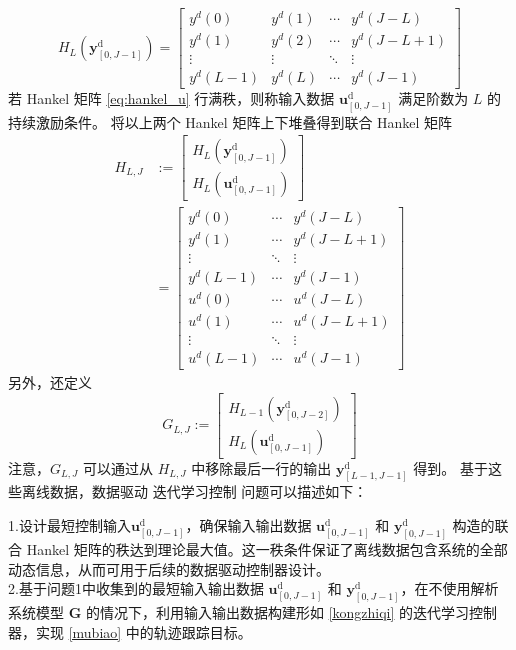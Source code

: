 \begin{equation}
	H_L(\mathbf{y}^{\mathrm{d}}_{[0,J-1]}) = \begin{bmatrix}
		y^d(0)   & y^d(1)   & \cdots & y^d(J-L) \\
		y^d(1)   & y^d(2)   & \cdots & y^d(J-L+1)   \\
		\vdots   & \vdots   & \ddots & \vdots     \\
		y^d(L-1)   & y^d(L) & \cdots & y^d(J-1)
	\end{bmatrix}
	\label{eq:hankel_y}
\end{equation}
若 Hankel 矩阵 \eqref{eq:hankel_u} 行满秩，则称输入数据 \( \mathbf{u}^{\mathrm{d}}_{[0,J-1]} \) 满足阶数为 \( L \) 的持续激励条件。
将以上两个 Hankel 矩阵上下堆叠得到联合 Hankel 矩阵
\begin{equation}
	\begin{aligned}
		H_{L,J} &:= \begin{bmatrix} H_L(\mathbf{y}^{\mathrm{d}}_{[0,J-1]}) \\ H_L(\mathbf{u}^{\mathrm{d}}_{[0,J-1]}) \end{bmatrix} \\
		&= \begin{bmatrix}
			y^d(0) & \cdots & y^d(J-L) \\
			y^d(1) & \cdots & y^d(J-L+1) \\
			\vdots & \ddots & \vdots \\
			y^d(L-1) & \cdots & y^d(J-1) \\
			u^d(0) & \cdots & u^d(J-L) \\
			u^d(1) & \cdots & u^d(J-L+1) \\
			\vdots & \ddots & \vdots \\
			u^d(L-1) & \cdots & u^d(J-1)
		\end{bmatrix}
	\end{aligned}
	\label{eq:Hkt}
\end{equation}
另外，还定义
\begin{equation}
	G_{L,J} := \begin{bmatrix} H_{L-1}(\mathbf{y}^{\mathrm{d}}_{[0,J-2]}) \\ H_L(\mathbf{u}^{\mathrm{d}}_{[0,J-1]}) \end{bmatrix}
	\label{eq:Gkt}
\end{equation}
注意，\( G_{L,J} \) 可以通过从 \( H_{L,J} \) 中移除最后一行的输出 \( \mathbf{y}^{\mathrm{d}}_{[L-1,J-1]} \) 得到。
基于这些离线数据，数据驱动 迭代学习控制 问题可以描述如下：
\begin{problemnode}
	1.设计最短控制输入$\mathbf{u}^{\mathrm{d}}_{[0,J-1]}$，确保输入输出数据 \( \mathbf{u}^{\mathrm{d}}_{[0,J-1]} \) 和 \( \mathbf{y}^{\mathrm{d}}_{[0,J-1]} \) 构造的联合 Hankel 矩阵的秩达到理论最大值。这一秩条件保证了离线数据包含系统的全部动态信息，从而可用于后续的数据驱动控制器设计。\\
	2.基于问题1中收集到的最短输入输出数据 \( \mathbf{u}^{\mathrm{d}}_{[0,J-1]} \) 和 \( \mathbf{y}^{\mathrm{d}}_{[0,J-1]} \)，在不使用解析系统模型 \( \mathbf{G} \) 的情况下，利用输入输出数据构建形如 \eqref{kongzhiqi} 的迭代学习控制器，实现 \eqref{mubiao} 中的轨迹跟踪目标。
\end{problemnode}

